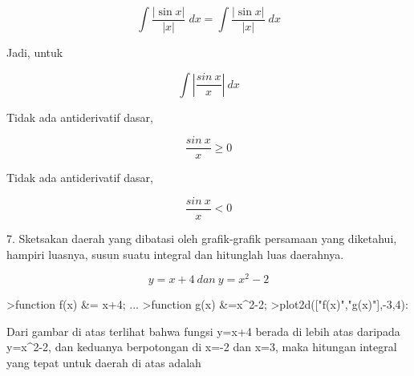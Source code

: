 \documentclass{article}
\begin{document}
\begin{eulernotebook}
\begin{eulercomment}
\begin{eulercomment}
\begin{euleroutput}
\end{euleroutput}
\begin{eulerformula}
\[
\int {\frac{\left| \sin x\right| }{\left| x\right| }}{\;dx}=\int {  \frac{\left| \sin x\right| }{\left| x\right| }}{\;dx}
\]
\end{eulerformula}
\begin{eulercomment}
Jadi, untuk\\
\end{eulercomment}
\begin{eulerformula}
\[
\int \left |\frac{sin\ x}{x}\right |\ dx
\]
\end{eulerformula}
\begin{eulercomment}
Tidak ada antiderivatif dasar,\\
\end{eulercomment}
\begin{eulerformula}
\[
\frac{sin\ x}{x}\ge 0
\]
\end{eulerformula}
\begin{eulercomment}
Tidak ada antiderivatif dasar,\\
\end{eulercomment}
\begin{eulerformula}
\[
\frac{sin\ x}{x} < 0
\]
\end{eulerformula}
\begin{eulercomment}
7. Sketsakan daerah yang dibatasi oleh grafik-grafik persamaan yang
diketahui, hampiri luasnya, susun suatu integral dan hitunglah luas
daerahnya.\\
\end{eulercomment}
\begin{eulerformula}
\[
y=x+4 \ dan\ y=x^2-2
\]
\end{eulerformula}
\begin{eulerprompt}
>function f(x) &= x+4; ...
>function g(x) &=x^2-2;
>plot2d(["f(x)","g(x)"],-3,4):
\end{eulerprompt}
\begin{eulercomment}
Dari gambar di atas terlihat bahwa fungsi y=x+4 berada di lebih atas
daripada y=x\textasciicircum{}2-2, dan keduanya berpotongan di x=-2 dan x=3, maka
hitungan integral yang tepat untuk daerah di atas adalah\\
\end{eulercomment}
\begin{eulerformula}

\end{eulerformula}
\end{eulercomment}
\end{eulercomment}
\end{eulernotebook}
\end{document}
